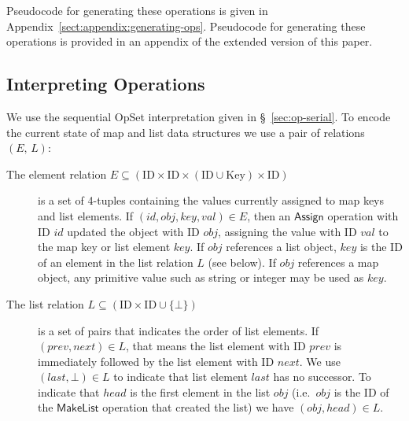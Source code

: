 \ifarxiv
  \noindent
  Pseudocode for generating these operations is given in Appendix~\ref{sect:appendix:generating-ops}.
\else
  \noindent
  Pseudocode for generating these operations is provided in an appendix of the extended version of this paper.
\fi


\subsection{Interpreting Operations}\label{sec:datatypes-interp}

We use the sequential OpSet interpretation given in \S~\ref{sec:op-serial}.
To encode the current state of map and list data structures we use a pair of relations $(E,\, L)$:

\begin{description}
    \item[The element relation $E \subseteq (\mathrm{ID} \times \mathrm{ID} \times (\mathrm{ID} \cup \mathrm{Key}) \times \mathrm{ID})$]
        is a set of 4-tuples containing the values currently assigned to map keys and list elements.
        If $(\mathit{id}, \mathit{obj}, \mathit{key}, \mathit{val}) \in E$, then an $\mathsf{Assign}$ operation with ID $\mathit{id}$ updated the object with ID $\mathit{obj}$, assigning the value with ID $\mathit{val}$ to the map key or list element $\mathit{key}$.
        If $\mathit{obj}$ references a list object, $\mathit{key}$ is the ID of an element in the list relation $L$ (see below).
        If $\mathit{obj}$ references a map object, any primitive value such as string or integer may be used as $\mathit{key}$.
      \item[The list relation $L \subseteq (\mathrm{ID} \times \mathrm{ID} \cup \{\bot\})$] is a set of pairs that indicates the order of list elements.
        If $(\mathit{prev}, \mathit{next}) \in L$, that means the list element with ID $\mathit{prev}$ is immediately followed by the list element with ID $\mathit{next}$.
        We use $(\mathit{last}, \bot) \in L$ to indicate that list element $\mathit{last}$ has no successor.
        To indicate that $\mathit{head}$ is the first element in the list $\mathit{obj}$ (i.e.\ $\mathit{obj}$ is the ID of the $\mathsf{MakeList}$ operation that created the list) we have $(\mathit{obj}, \mathit{head}) \in L$.
\end{description}

